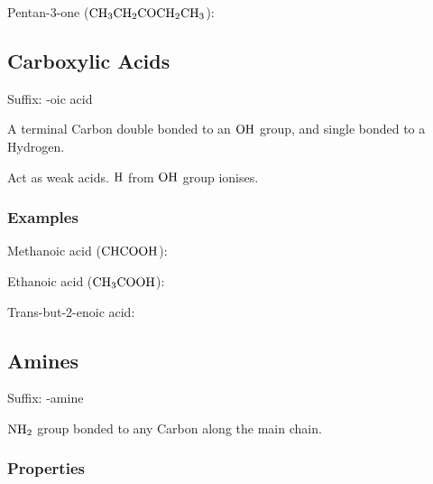 \documentclass[a4paper,11pt]{article}
\begin{document}
Pentan-3-one ($\ce{CH3CH2COCH2CH3}$):

\begin{center}
\end{center}


\subsection{Carboxylic Acids}

Suffix: -oic acid

A terminal Carbon double bonded to an $\ce{OH}$ group, and single bonded to a
Hydrogen.

Act as weak acids. $\ce{H}$ from $\ce{OH}$ group ionises.


\subsubsection{Examples}

Methanoic acid ($\ce{CHCOOH}$):

\begin{center}
\end{center}

Ethanoic acid ($\ce{CH3COOH}$):

\begin{center}
\end{center}

Trans-but-2-enoic acid:

\begin{center}
\end{center}


\subsection{Amines}

Suffix: -amine

$\ce{NH2}$ group bonded to any Carbon along the main chain.


\subsubsection{Properties}
\end{document}
